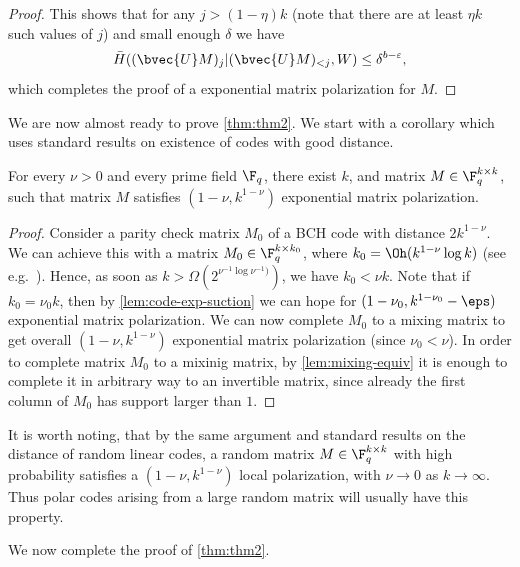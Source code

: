 \documentclass[11pt]{article}
\renewcommand{\H}{\bar{H}}
\begin{document}
\begin{proof}
	This shows that for any $j > (1 - \eta) k$ (note that there are at least $\eta k$ such values of $j$) and small enough $\delta$ we have
	\begin{equation*}
		\H( (\bvec{U}M)_j | (\bvec{U}M)_{<j}, W) \leq \delta^{b - \varepsilon},
	\end{equation*}
	which completes the proof of a exponential matrix polarization for $M$.
\end{proof}

We are now almost ready to prove \cref{thm:thm2}. We start with a corollary which uses standard results on existence of codes with good distance.

\begin{corollary}
	\label{cor:beta-close-to-one}
	For every $\nu>0$ and every prime field $\F_q$, there exist $k$, and matrix $M \in \F_q^{k\times k}$, such that matrix $M$ satisfies $(1 - \nu, k^{1-\nu})$ exponential matrix polarization.
\end{corollary}
\begin{proof}
	Consider a parity check matrix $M_0$ of a BCH code with distance $2 k^{1 - \nu}$. We can achieve this with a matrix $M_0 \in \F_q^{k \times k_0}$, where $k_0 = \Oh(k^{1 - \nu} \log k)$ (see e.g.~\cite[Exercise 5.10]{essential-coding}).  
	Hence, as soon as $k > \Omega (2^{\nu^{-1} \log \nu^{-1})})$, we have $k_0 < \nu k$. Note that if $k_0=\nu_0 k$, then by \cref{lem:code-exp-suction} we can hope for $(1-\nu_0,k^{1-\nu_0}-\eps)$ exponential matrix polarization. We can now complete $M_0$ to a mixing matrix 
	to get overall $(1 - \nu, k^{1-\nu})$ exponential matrix polarization (since $\nu_0<\nu$). In order to complete matrix $M_0$ to a mixinig matrix, by \cref{lem:mixing-equiv} it is enough to complete it in arbitrary way to an invertible matrix, since already the first column of $M_0$ has support larger than $1$.
\end{proof}

\begin{remark}
	It is worth noting, that by the same argument and standard results on the distance of random linear codes, a random matrix $M \in \F_q^{k\times k}$ with high probability satisfies a $(1-\nu, k^{1-\nu})$ local polarization, with $\nu \to 0$ as $k \to \infty$.  Thus polar codes arising from a large random matrix will usually have this property.
\end{remark}

We now complete the proof of \cref{thm:thm2}.
\end{document}
